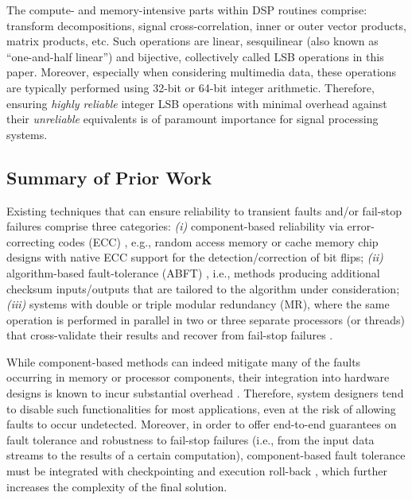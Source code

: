 \documentclass[twocolumn,english,onecolumn]{IEEEtran}
\theoremstyle{plain}
\theoremstyle{plain}
\begin{document}
The compute- and memory-intensive parts within DSP routines comprise:
transform decompositions, signal cross-correlation, inner or outer
vector products, matrix products, etc. Such operations are linear,
sesquilinear (also known as ``one-and-half linear'') and bijective,
collectively called LSB operations in this paper. Moreover, especially
when considering multimedia data, these operations are typically performed
using 32-bit or 64-bit integer arithmetic. Therefore, ensuring \emph{highly
reliable} integer LSB operations with minimal overhead against their
\emph{unreliable} equivalents is of paramount importance for signal
processing systems. 


\subsection{Summary of Prior Work }

Existing techniques that can ensure reliability to transient faults
and/or fail-stop failures comprise three categories: \emph{(i)} component-based
reliability via error-correcting codes (ECC) \cite{alameldeen2011energy},
e.g., random access memory or cache memory chip designs with native
ECC support for the detection/correction of bit flips;\emph{ (ii)}
algorithm-based fault-tolerance (ABFT) \cite{huang1984algorithm,chen2005fault,luk1985weighted,stefanidis2004weighted,nair1988linearCode,sloan2012algorithmic,rexford1992partitioned},
i.e., methods producing additional checksum inputs/outputs that are
tailored to the algorithm under consideration; \emph{(iii)} systems
with double or triple modular redundancy (MR), where the same operation
is performed in parallel in two or three separate processors (or threads)
that cross-validate their results and recover from fail-stop failures
\cite{engelmann2009case}. 

While component-based methods can indeed mitigate many of the faults
occurring in memory or processor components, their integration into
hardware designs is known to incur substantial overhead \cite{fatica2009accelerating}.
Therefore, system designers tend to disable such functionalities for
most applications, even at the risk of allowing faults to occur undetected.
Moreover, in order to offer end-to-end guarantees on fault tolerance
and robustness to fail-stop failures (i.e., from the input data streams
to the results of a certain computation), component-based fault tolerance
must be integrated with checkpointing and execution roll-back \cite{chen2005fault},
which further increases the complexity of the final solution. 
\end{document}
